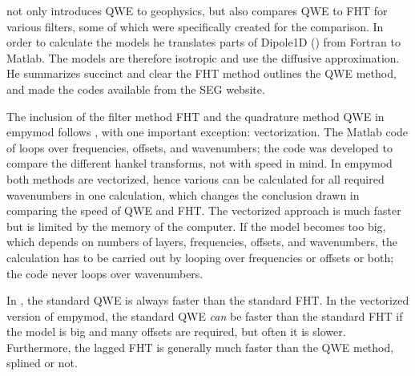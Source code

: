 \documentclass[manuscript,revised]{geophysics}
\begin{document}
 not only introduces QWE to geophysics, but also
compares QWE to FHT for various filters, some of which were specifically
created for the comparison. In order to calculate the models he translates
parts of Dipole1D (\cite{GEO.09.Key}) from Fortran to Matlab. The
models are therefore isotropic and use the diffusive approximation. He
summarizes succinct and clear the FHT method\new{,}  outlines the QWE
method, and made the codes available from the SEG website.

The inclusion of the filter method FHT and the quadrature method QWE in
empymod follows \cite{GEO.12.Key}, with one important exception:
vectorization. The Matlab code of \cite{GEO.12.Key} loops over
frequencies, offsets, and wavenumbers; the code was developed to compare the
different hankel transforms, not with speed in mind.  In empymod both methods
are vectorized, hence various   can be calculated for all
required wavenumbers in one calculation, which changes the conclusion drawn in
\cite{GEO.12.Key} comparing the speed of QWE and FHT.
The vectorized approach is much faster but is limited by the memory of the
computer. If the model becomes too big, which depends on numbers of layers,
frequencies, offsets, and wavenumbers, the calculation has to be carried out by
looping over frequencies or offsets or both; the code never loops over
wavenumbers.

In \cite{GEO.12.Key}, the standard QWE is always faster than the standard FHT. In the
vectorized version of empymod, the standard QWE \emph{can} be faster than the
standard FHT if the model is big and many offsets are required, but often it is
slower. Furthermore, the lagged FHT is generally much faster than the QWE
method, splined or not.
\end{document}

